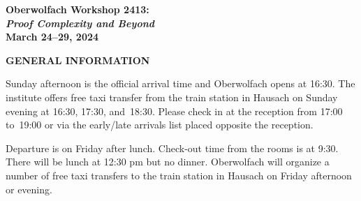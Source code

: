 \documentclass[11pt]{article}
\begin{document}
\begin{center}

  \Large{\bf
    Oberwolfach Workshop 2413: \\
    \textit{Proof Complexity and Beyond}  \\
    March 24--29, 2024}
\end{center}

\medskip

\begin{center}
{\bf GENERAL INFORMATION}
\end{center}

%   
%   
%   
%   
%   


\begin{compactitem}

\item
  Sunday afternoon is the official arrival time and Oberwolfach opens
  at 16:30. The institute offers free taxi transfer from the train
  station in Hausach on Sunday evening
  at 16:30, 17:30, and~18:30.
  Please check in at the reception from 17:00 to~19:00 or via the
  early/late arrivals list placed opposite the reception.

\item
  Departure is on Friday after lunch.
  Check-out time from the rooms is at 9:30. There will be
  lunch at 12:30 pm but no dinner. Oberwolfach will
  organize a number of free taxi transfers to the train
  station in Hausach on Friday afternoon or evening.
\end{compactitem}
\end{document}
